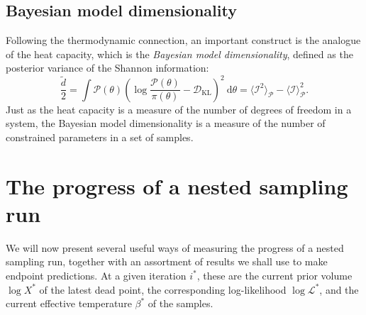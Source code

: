 \documentclass[usenatbib]{mnras}
\newcommand{\Like}{\mathcal{L}}
\newcommand{\DKL}{\mathcal{D}_\mathrm{KL}}
\begin{document}
\subsection{Bayesian model dimensionality}\label{sec:dimensionality}
Following the thermodynamic connection, an important construct is the analogue of the heat capacity, which is the \textit{Bayesian model dimensionality}, defined as the posterior variance of the Shannon information: 
\begin{equation}
\frac{\tilde{d}}{2} = \int \mathcal{P}(\theta) \left(\log \frac{\mathcal{P}(\theta)}{\pi(\theta)} - \DKL\right)^2 \: \mathrm{d}\theta
= \langle \mathcal{I}^2 \rangle_\mathcal{P} - \langle \mathcal{I} \rangle^2_\mathcal{P}.
\end{equation}
Just as the heat capacity is a measure of the number of degrees of freedom in a system, the Bayesian model dimensionality is a measure of the number of constrained parameters in a set of samples.

\section{The progress of a nested sampling run}\label{sec:convergence}
We will now present several useful ways of measuring the progress of a nested sampling run, together with an assortment of results we shall use to make endpoint predictions. At a given iteration $i^{*}$, these are the current prior volume $\log X^{*}$ of the latest dead point, the corresponding log-likelihood $\log\Like^{*}$, and the current effective temperature $\beta^{*}$ of the samples. 
\end{document}
